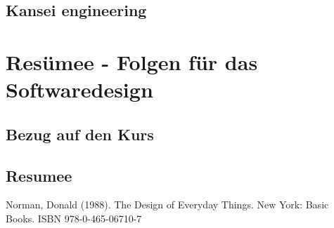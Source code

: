 \documentclass[parskip,headsepline, headtopline, %
footsepline, oneside, 12pt, headings=small]{scrreprt}
\begin{document}
\section{Kansei engineering}

 
\chapter{Resümee - Folgen für das Softwaredesign}
\section{Bezug auf den Kurs}
\section{Resumee}

\begin{thebibliography}{9}
	 Norman, Donald (1988). The Design of Everyday Things. New York: Basic Books. ISBN 978-0-465-06710-7 
\end{thebibliography}
\end{document}
